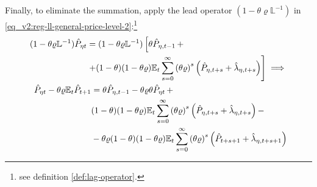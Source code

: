 \documentclass[../thesis.tex]{subfiles}
\begin{document}
Finally, to eliminate the summation, apply the lead operator $(1- \theta \varrho \mathbb{L}^{-1})$ in \ref{eq_v2:reg-ll-general-price-level-2}:\footnote{see definition \ref{def:lag-operator}.}
\begin{align}
	\begin{split}
		(1- \theta \varrho \mathbb{L}^{-1}) \hat{P}_{\eta t} &= (1- \theta \varrho \mathbb{L}^{-1}) \left[ \theta \hat{P}_{\eta, t-1} \, + \right. \\
		&\left. + (1-\theta) (1- \theta \varrho) {\mathbb{E}_{t}} \sum_{s=0}^{\infty} \left( \theta \varrho \right)^s \left( \hat{P}_{\eta, t+s} + \hat{\lambda}_{\eta, t+s} \right) \right] \implies \nonumber
	\end{split} \\
	\begin{split}
		\hat{P}_{\eta t} - \theta \varrho {\mathbb{E}_{t}} \hat{P}_{t+1} &= \theta \hat{P}_{\eta, t-1} - \theta \varrho \theta \hat{P}_{\eta t} \, + \\
		& (1-\theta) (1- \theta \varrho) {\mathbb{E}_{t}} \sum_{s=0}^{\infty} \left( \theta \varrho \right)^s \left( \hat{P}_{\eta, t+s} + \hat{\lambda}_{\eta, t+s} \right) - \\
		& - \theta \varrho (1-\theta) (1- \theta \varrho) {\mathbb{E}_{t}} \sum_{s=0}^{\infty} \left( \theta \varrho \right)^s \left( \hat{P}_{t+s+1} + \hat{\lambda}_{\eta, t+s+1} \right)
	\end{split} \label{eq_v2:reg-ll-general-price-level-3}
\end{align}
\end{document}
